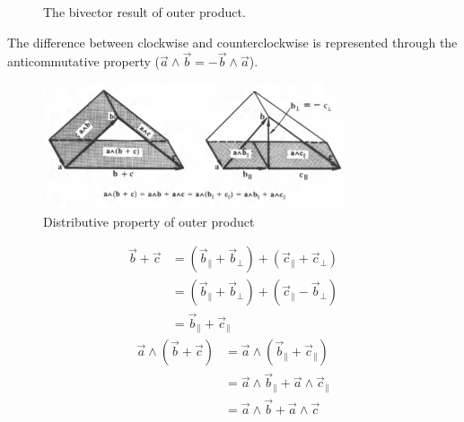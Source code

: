 \begin{figure}[H]
    \begin{center}
    \end{center}
    \caption{The bivector result of outer product.}%
    \label{fig:bivector-result}
\end{figure}

The difference between clockwise and counterclockwise is represented through the anticommutative property ($\vec{a}\wedge\vec{b}=-\vec{b}\wedge \vec{a}$).

\begin{figure}[htpb]
    \centering
    \includegraphics[width=0.8\textwidth]{figures/bivectors-dist.PNG}
    \caption{Distributive property of outer product}
    \label{fig:outer-product-distributive}
\end{figure}

\begin{align*}
    \vec{b} + \vec{c} &= (\vec{b}_\parallel+\vec{b}_\perp) + (\vec{c}_\parallel+\vec{c}_\perp) \\
    &= (\vec{b}_\parallel+\vec{b}_\perp) + (\vec{c}_\parallel-\vec{b}_\perp) \\
    &= \vec{b}_\parallel + \vec{c}_\parallel
\end{align*}
\begin{align*}
    \vec{a} \wedge ( \vec{b} + \vec{c} ) &= \vec{a} \wedge (\vec{b}_\parallel + \vec{c}_\parallel) \\
                                         &= \vec{a} \wedge \vec{b}_\parallel + \vec{a} \wedge \vec{c}_\parallel \\
                                         &= \vec{a} \wedge \vec{b} + \vec{a} \wedge \vec{c}
\end{align*}

